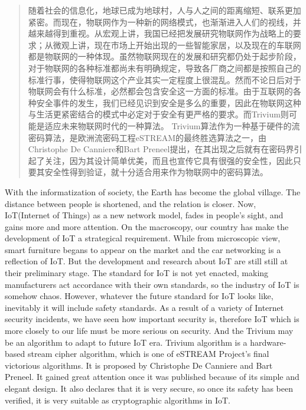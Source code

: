 
\begin{abstract}

随着社会的信息化，地球已成为地球村，人与人之间的距离缩短、联系更加紧密。而现在，物联网作为一种新的网络模式，也渐渐进入人们的视线，并越来越得到重视。从宏观上讲，我国已经把发展研究物联网作为战略上的要求；从微观上讲，现在市场上开始出现的一些智能家居，以及现在的车联网都是物联网的一种体现。虽然物联网现在的发展和研究都仍处于起步阶段，对于物联网的各种标准都尚未有明确规定，导致各厂商之间都是按照自己的标准行事，使得物联网这个产业其实一定程度上很混乱。然而不论日后对于物联网会有什么标准，必然都会包含安全这一方面的标准。由于互联网的各种安全事件的发生，我们已经见识到安全是多么的重要，因此在物联网这种与生活更紧密结合的模式中必定对于安全有更严格的要求。而Trivium则可能是适应未来物联网时代的一种算法。
Trivium算法作为一种基于硬件的流密码算法，是欧洲流密码工程eSTREAM的最终胜选算法之一，由Christophe De Canniere和Bart Preneel提出，在其出现之后就有在密码界引起了关注，因为其设计简单优美，而且也宣传它具有很强的安全性，因此只要其安全性得到验证，就十分适合用来作为物联网中的密码算法。

\end{abstract}

\begin{englishabstract}

With the informatization of society, the Earth has become the global village. The distance between people is shortened, and the relation is closer. Now, IoT(Internet of Things) as a new network model, fades in people's sight, and gains more and more attention. On the macroscopy, our country has make the development of IoT a strategical requirement. While from microscopic view, smart furniture begans to appear on the market and the car networking is a reflection of IoT. But the development and research about IoT are still still at their preliminary stage. The standard for IoT is not yet enacted, making manufacturers act accordance with their own standards, so the industry of IoT is somehow chaos. However, whatever the future standard for IoT looks like, inevitably it will include safety standards. As a result of a variety of Internet security incidents, we have seen how important security is, therefore IoT which is more closely to our life must be more serious on security. And the Trivium may be an algorithm to adapt to future IoT era.
Trivium algorithm is a hardware-based stream cipher algorithm, which is one of eSTREAM Project's final victorious algorithms. It is proposed by Christophe De Canniere and Bart Preneel. It gained great attention once it was published because of its simple and elegant design. It also declares that it is very secure, so once its safety has been verified, it is very suitable as cryptographic algorithms in IoT.

\end{englishabstract}


